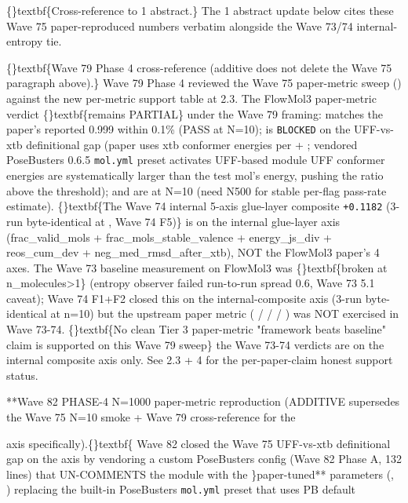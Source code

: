\documentclass{article}
\begin{document}
\{\}textbf\{Cross-reference to 1 abstract.\} The 1 abstract update below cites these Wave 75 paper-reproduced numbers verbatim alongside the Wave 73/74 internal-entropy tie.

\{\}textbf\{Wave 79 Phase 4 cross-reference (additive  does not delete the Wave 75 paragraph above).\} Wave 79 Phase 4 reviewed the Wave 75 paper-metric sweep () against the new per-metric support table at  2.3. The FlowMol3 paper-metric verdict \{\}textbf\{remains PARTIAL\} under the Wave 79 framing:  matches the paper's reported 0.999 within 0.1\% (PASS at N=10);  is \texttt{BLOCKED} on the UFF-vs-xtb definitional gap (paper uses xtb conformer energies per  + ; vendored PoseBusters 0.6.5 \texttt{mol.yml} preset activates UFF-based  module  UFF conformer energies are systematically larger than the test mol's energy, pushing the ratio above the  threshold);  and  are  at N=10 (need N500 for stable per-flag pass-rate estimate). \{\}textbf\{The Wave 74 internal 5-axis glue-layer composite \texttt{+0.1182} (3-run byte-identical at , Wave 74 F5)\} is on the internal glue-layer axis (frac\_valid\_mols + frac\_mols\_stable\_valence + energy\_js\_div + reos\_cum\_dev + neg\_med\_rmsd\_after\_xtb), NOT the FlowMol3 paper's 4 axes. The Wave 73 baseline measurement on FlowMol3 was \{\}textbf\{broken at n\_molecules>1\} (entropy observer failed  run-to-run spread 0.6, Wave 73 5.1 caveat); Wave 74 F1+F2 closed this on the internal-composite axis (3-run byte-identical at n=10) but the upstream paper metric ( /  /  / ) was NOT exercised in Wave 73-74. \{\}textbf\{No clean Tier 3 paper-metric "framework beats baseline" claim is supported on this Wave 79 sweep\}  the Wave 73-74  verdicts are on the internal composite axis only. See  2.3 + 4 for the per-paper-claim honest support status.

**Wave 82 PHASE-4 N=1000 paper-metric reproduction (ADDITIVE  supersedes the Wave 75 N=10 smoke + Wave 79 cross-reference for the

 axis specifically).\{\}textbf\{ Wave 82 closed the Wave 75 UFF-vs-xtb definitional gap on the  axis by vendoring a custom PoseBusters config  (Wave 82 Phase A, 132 lines) that UN-COMMENTS the  module with the \}paper-tuned** parameters (, )  replacing the built-in PoseBusters \texttt{mol.yml} preset that uses PB default
\end{document}
